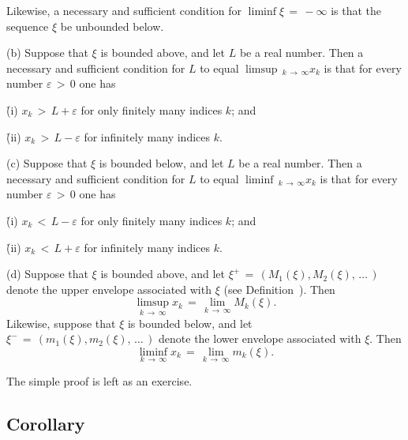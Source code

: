     Likewise, a necessary and sufficient condition for $\liminf {\xi} \,=\, -{\infty}$ is that the sequence ${\xi}$ be unbounded below.


\V

        (b) Suppose that ${\xi}$ is bounded above, and let $L$ be a real number.
    Then a necessary and sufficient condition for $L$ to equal $\limsup\,_{k \,{\rightarrow}\, {\infty}} x_{k}$ is that for every number ${\varepsilon}\,>\,0$ one has

        \h (i) $x_{k}\,>\,L+{\varepsilon}$ for only finitely many indices $k$; and

        \h (ii) $x_{k}\,>\,L-{\varepsilon}$ for infinitely many indices $k$.

        \V

        (c) Suppose that ${\xi}$ is bounded below, and let $L$ be a real number.
    Then a necessary and sufficient condition for $L$ to equal $\liminf\,_{k \,{\rightarrow}\, {\infty}} x_{k}$ is that for every number ${\varepsilon}\,>\,0$ one has

        \h (i) $x_{k}\,<\,L-{\varepsilon}$ for only finitely many indices $k$; and

        \h (ii) $x_{k}\,<\,L+{\varepsilon}$ for infinitely many indices $k$.

\V

\V

        (d) Suppose that ${\xi}$ is bounded above, and let ${\xi}^{+} \,=\, (M_{1}({\xi}),M_{2}({\xi}),\,{\ldots}\,)$ denote the upper envelope associated with ${\xi}$ (see Definition~). Then
        \begin{equation}
        \label{EqnC.55a}
        \limsup_{k \,{\rightarrow}\, {\infty}} x_{k} \,=\, \lim_{k \,{\rightarrow}\, {\infty}} M_{k}({\xi}). 
        \end{equation}
    Likewise, suppose that ${\xi}$ is bounded below, and let ${\xi}^{-} \,=\, (m_{1}({\xi}),m_{2}({\xi}),\,{\ldots}\,)$ denote the lower envelope associated with ${\xi}$. Then
        \begin{equation}
        \label{EqnC.55b}
        \liminf_{k \,{\rightarrow}\, {\infty}} x_{k} \,=\, \lim_{k \,{\rightarrow}\, {\infty}} m_{k}({\xi}). 
        \end{equation}


        The simple proof is left as an exercise.

\V

            \subsection{\small{\bf Corollary}}
            \label{CorC50.180}

